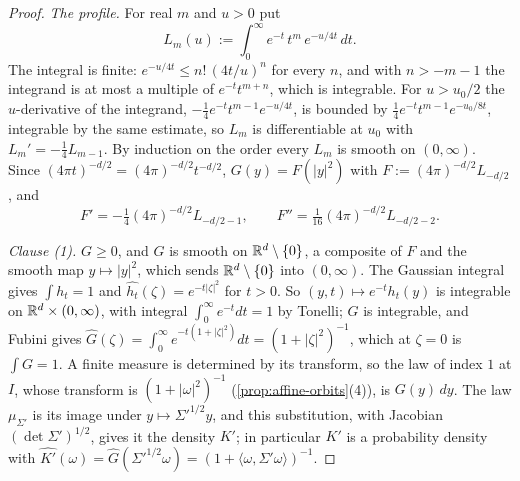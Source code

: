 \begin{proof}\leanok
\emph{The profile.} For real $m$ and $u > 0$ put
\[
  L_m(u) := \int_0^\infty e^{-t}\,t^m\,e^{-u/4t}\,dt .
\]
The integral is finite: $e^{-u/4t} \le n!\,(4t/u)^n$ for every $n$, and with $n > -m-1$ the
integrand is at most a multiple of $e^{-t}t^{m+n}$, which is integrable. For $u > u_0/2$ the
$u$-derivative of the integrand, $-\tfrac14e^{-t}t^{m-1}e^{-u/4t}$, is bounded by
$\tfrac14e^{-t}t^{m-1}e^{-u_0/8t}$, integrable by the same estimate, so $L_m$ is differentiable at
$u_0$ with $L_m' = -\tfrac14L_{m-1}$. By induction on the order every $L_m$ is smooth on
$(0,\infty)$. Since $(4\pi t)^{-d/2} = (4\pi)^{-d/2}t^{-d/2}$, $G(y) = F(|y|^2)$ with
$F := (4\pi)^{-d/2}L_{-d/2}$, and
\[
  F' = -\tfrac14(4\pi)^{-d/2}L_{-d/2-1} , \qquad F'' = \tfrac1{16}(4\pi)^{-d/2}L_{-d/2-2} .
\]

\emph{Clause (1).} $G \ge 0$, and $G$ is smooth on $\mathbb{R}^d \setminus \{0\}$, a composite of $F$ and the
smooth map $y \mapsto |y|^2$, which sends $\mathbb{R}^d \setminus \{0\}$ into $(0,\infty)$. The Gaussian
integral gives $\int h_t = 1$ and $\widehat{h_t}(\zeta) = e^{-t|\zeta|^2}$ for $t > 0$. So
$(y,t) \mapsto e^{-t}h_t(y)$ is integrable on $\mathbb{R}^d \times (0,\infty)$, with integral
$\int_0^\infty e^{-t}dt = 1$ by Tonelli; $G$ is integrable, and Fubini gives
$\widehat G(\zeta) = \int_0^\infty e^{-t(1+|\zeta|^2)}dt = (1+|\zeta|^2)^{-1}$, which at $\zeta = 0$ is
$\int G = 1$. A finite measure is determined by its transform, so the \Matern{} law of index $1$ at
$I$, whose transform is $(1+|\omega|^2)^{-1}$ (\ref{prop:affine-orbits}(4)), is $G(y)\,dy$. The law
$\mu_{\Sigma'}$ is its image under $y \mapsto \Sigma'^{1/2}y$, and this substitution, with Jacobian
$(\det\Sigma')^{1/2}$, gives it the density $K'$; in particular $K'$ is a probability density with
$\widehat{K'}(\omega) = \widehat G(\Sigma'^{1/2}\omega) = (1 + \langle\omega,\Sigma'\omega\rangle)^{-1}$.


\end{proof}
